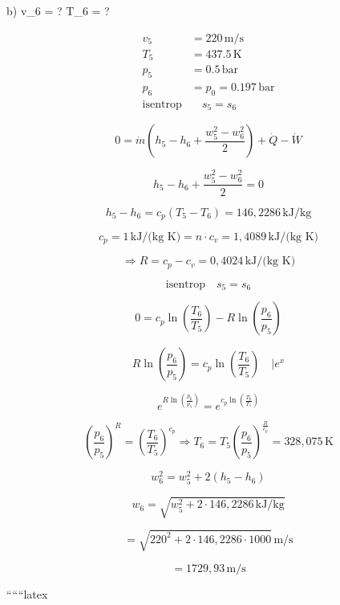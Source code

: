b) \quad v_6 = ? \quad T_6 = ? 

\[
\begin{aligned}
v_5 &= 220 \, \text{m/s} \\
T_5 &= 437.5 \, \text{K} \\
p_5 &= 0.5 \, \text{bar} \\
p_6 &= p_0 = 0.197 \, \text{bar} \\
\text{isentrop} & \quad s_5 = s_6
\end{aligned}
\]


\[
0 = \dot{m} \left( h_5 - h_6 + \frac{w_5^2 - w_6^2}{2} \right) + \dot{Q} - \dot{W}
\]

 \quad {}

\[
h_5 - h_6 + \frac{w_5^2 - w_6^2}{2} = 0
\]

\[
h_5 - h_6 = c_p (T_5 - T_6) = 146,2286 \, \text{kJ/kg}
\]

\[
c_p = 1 \, \text{kJ/(kg K)} = n \cdot c_v = 1,4089 \, \text{kJ/(kg K)}
\]

\[
\Rightarrow R = c_p - c_v = 0,4024 \, \text{kJ/(kg K)}
\]

\[
\text{isentrop} \quad s_5 = s_6
\]

\[
0 = c_p \ln \left( \frac{T_6}{T_5} \right) - R \ln \left( \frac{p_6}{p_5} \right)
\]

\[
R \ln \left( \frac{p_6}{p_5} \right) = c_p \ln \left( \frac{T_6}{T_5} \right) \quad | e^x
\]

\[
e^{R \ln \left( \frac{p_6}{p_5} \right)} = e^{c_p \ln \left( \frac{T_6}{T_5} \right)}
\]

\[
\left( \frac{p_6}{p_5} \right)^R = \left( \frac{T_6}{T_5} \right)^{c_p} \Rightarrow T_6 = T_5 \left( \frac{p_6}{p_5} \right)^{\frac{R}{c_p}} = 328,075 \, \text{K}
\]

\[
w_6^2 = w_5^2 + 2 (h_5 - h_6)
\]

\[
w_6 = \sqrt{w_5^2 + 2 \cdot 146,2286 \, \text{kJ/kg}}
\]

\[
= \sqrt{220^2 + 2 \cdot 146,2286 \cdot 1000} \, \text{m/s}
\]

\[
= 1729,93 \, \text{m/s}
\]

``````latex